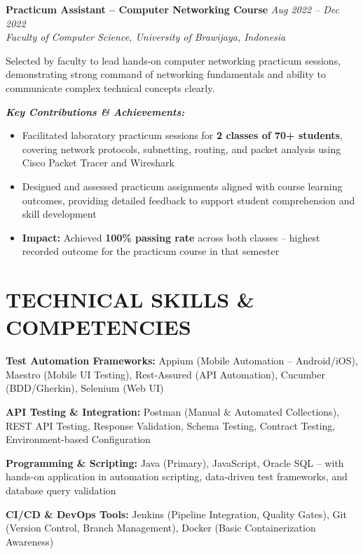 \documentclass[10pt,a4paper]{article}
\newcommand{\experience}[4]{%
    \noindent\textbf{#1} \hfill \textit{#2}\\
    \textit{#3} \hfill #4\vspace{2pt}
}
\begin{document}
\vspace{4pt}

\experience{Practicum Assistant -- Computer Networking Course}{Aug 2022 -- Dec 2022}{Faculty of Computer Science, University of Brawijaya, Indonesia}{}

Selected by faculty to lead hands-on computer networking practicum sessions, demonstrating strong command of networking fundamentals and ability to communicate complex technical concepts clearly.

\textit{\textbf{Key Contributions \& Achievements:}}
\begin{itemize}
    \item Facilitated laboratory practicum sessions for \textbf{2 classes of 70+ students}, covering network protocols, subnetting, routing, and packet analysis using Cisco Packet Tracer and Wireshark
    \item Designed and assessed practicum assignments aligned with course learning outcomes, providing detailed feedback to support student comprehension and skill development
    \item \textcolor{accent}{\textbf{Impact:}} Achieved \textbf{100\% passing rate} across both classes -- highest recorded outcome for the practicum course in that semester
\end{itemize}

\vspace{2pt}

\section*{TECHNICAL SKILLS \& COMPETENCIES}

\textbf{Test Automation Frameworks:} Appium (Mobile Automation -- Android/iOS), Maestro (Mobile UI Testing), Rest-Assured (API Automation), Cucumber (BDD/Gherkin), Selenium (Web UI)

\textbf{API Testing \& Integration:} Postman (Manual \& Automated Collections), REST API Testing, Response Validation, Schema Testing, Contract Testing, Environment-based Configuration

\textbf{Programming \& Scripting:} Java (Primary), JavaScript, Oracle SQL -- with hands-on application in automation scripting, data-driven test frameworks, and database query validation

\textbf{CI/CD \& DevOps Tools:} Jenkins (Pipeline Integration, Quality Gates), Git (Version Control, Branch Management), Docker (Basic Containerization Awareness)
\end{document}
